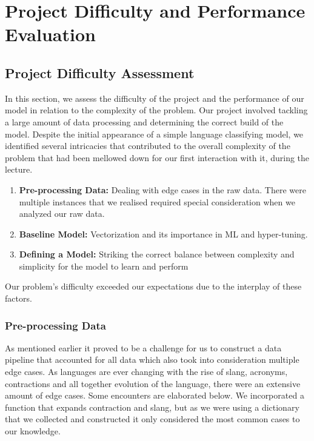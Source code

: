 \section{Project Difficulty and Performance Evaluation}


\subsection{Project Difficulty Assessment}
\vspace{-1em}
In this section, we assess the difficulty of the project and the performance of our model in relation to the complexity of the problem.
Our project involved tackling a large amount of data processing and determining the correct build of the model. Despite the initial appearance of a simple language classifying model, we identified several intricacies that contributed to the overall complexity of the problem that had been mellowed down for our first interaction with it, during the lecture.
\begin{enumerate}
    \item \textbf{Pre-processing Data:} Dealing with edge cases in the raw data. There were multiple instances that we realised required special consideration when we analyzed our raw data. 
    \item \textbf{Baseline Model:} Vectorization and its importance in ML and hyper-tuning.
    \item \textbf{Defining a Model:} Striking the correct balance between complexity and simplicity for the model to learn and perform
\end{enumerate}

Our problem's difficulty exceeded our expectations due to the interplay of these factors.
\vspace{-1em}
\subsubsection{Pre-processing Data}
\vspace{-0.5em}
As mentioned earlier it proved to be a challenge for us to construct a data pipeline that accounted for all data which also took into consideration multiple edge cases. As languages are ever changing with the rise of slang, acronyms, contractions and all together evolution of the language, there were an extensive amount of edge cases. Some encounters are elaborated below.
We incorporated a function that expands contraction and slang, but as we were using a dictionary that we collected and constructed it only considered the most common cases to our knowledge. 

